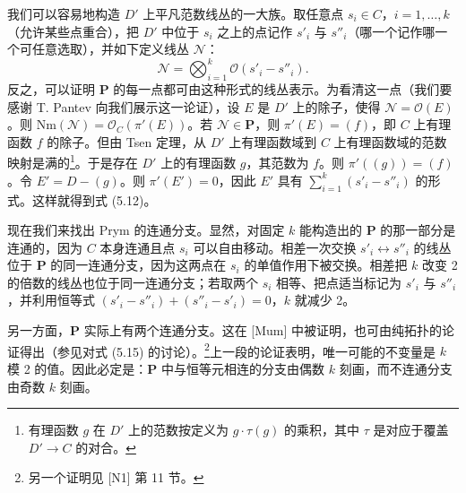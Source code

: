 我们可以容易地构造 $D'$ 上平凡范数线丛的一大族。取任意点 $s_i\in C$，$i=1,\dots,k$（允许某些点重合），把 $D'$ 中位于 $s_i$ 之上的点记作 $s'_i$ 与 $s''_i$（哪一个记作哪一个可任意选取），并如下定义线丛 $\mathcal{N}$：
\begin{equation}\tag{5.12}
\mathcal{N} = \bigotimes_{i=1}^{k}\mathcal{O}(s'_i - s''_i).
\end{equation}
反之，可以证明 $\boldsymbol{P}$ 的每一点都可由这种形式的线丛表示。为看清这一点（我们要感谢 T. Pantev 向我们展示这一论证），设 $E$ 是 $D'$ 上的除子，使得 $\mathcal{N} = \mathcal{O}(E)$。则 $\mathrm{Nm}(\mathcal{N}) = \mathcal{O}_C(\pi'(E))$。若 $\mathcal{N}\in\boldsymbol{P}$，则 $\pi'(E) = (f)$，即 $C$ 上有理函数 $f$ 的除子。但由 Tsen 定理，从 $D'$ 上有理函数域到 $C$ 上有理函数域的范数映射是满的\footnote{有理函数 $g$ 在 $D'$ 上的范数按定义为 $g\cdot\tau(g)$ 的乘积，其中 $\tau$ 是对应于覆盖 $D'\to C$ 的对合。}。于是存在 $D'$ 上的有理函数 $g$，其范数为 $f$。则 $\pi'((g)) = (f)$。令 $E' = D-(g)$。则 $\pi'(E') = 0$，因此 $E'$ 具有 $\sum_{i=1}^{k}(s'_i-s''_i)$ 的形式。这样就得到式 (5.12)。



现在我们来找出 Prym 的连通分支。显然，对固定 $k$ 能构造出的 $\boldsymbol{P}$ 的那一部分是连通的，因为 $C$ 本身连通且点 $s_i$ 可以自由移动。相差一次交换 $s'_i\leftrightarrow s''_i$ 的线丛位于 $\boldsymbol{P}$ 的同一连通分支，因为这两点在 $s_i$ 的单值作用下被交换。相差把 $k$ 改变 2 的倍数的线丛也位于同一连通分支；若取两个 $s_i$ 相等、把点适当标记为 $s'_i$ 与 $s''_i$，并利用恒等式 $(s'_i-s''_i)+(s''_i-s'_i) = 0$，$k$ 就减少 2。

另一方面，$\boldsymbol{P}$ 实际上有两个连通分支。这在 [Mum] 中被证明，也可由纯拓扑的论证得出（参见对式 (5.15) 的讨论）。\footnote{另一个证明见 [N1] 第 11 节。}上一段的论证表明，唯一可能的不变量是 $k$ 模 2 的值。因此必定是：$\boldsymbol{P}$ 中与恒等元相连的分支由偶数 $k$ 刻画，而不连通分支由奇数 $k$ 刻画。

